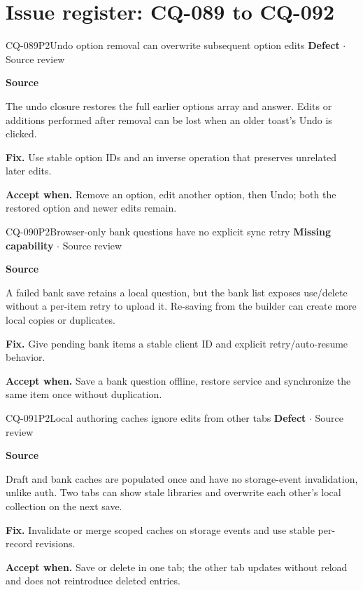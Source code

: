 \section*{Issue register: CQ-089 to CQ-092}
\begin{finding}{CQ-089}{P2}{Undo option removal can overwrite subsequent option edits}
\textbf{Defect} $\cdot$ Source review\par
\textbf{Source}\quad{}\par
The undo closure restores the full earlier options array and answer. Edits or additions performed after removal can be lost when an older toast's Undo is clicked.\par
\textbf{Fix.} Use stable option IDs and an inverse operation that preserves unrelated later edits.\par
\textbf{Accept when.} Remove an option, edit another option, then Undo; both the restored option and newer edits remain.
\end{finding}
\begin{finding}{CQ-090}{P2}{Browser-only bank questions have no explicit sync retry}
\textbf{Missing capability} $\cdot$ Source review\par
\textbf{Source}\quad{}\par
A failed bank save retains a local question, but the bank list exposes use/delete without a per-item retry to upload it. Re-saving from the builder can create more local copies or duplicates.\par
\textbf{Fix.} Give pending bank items a stable client ID and explicit retry/auto-resume behavior.\par
\textbf{Accept when.} Save a bank question offline, restore service and synchronize the same item once without duplication.
\end{finding}
\begin{finding}{CQ-091}{P2}{Local authoring caches ignore edits from other tabs}
\textbf{Defect} $\cdot$ Source review\par
\textbf{Source}\quad{}\par
Draft and bank caches are populated once and have no storage-event invalidation, unlike auth. Two tabs can show stale libraries and overwrite each other's local collection on the next save.\par
\textbf{Fix.} Invalidate or merge scoped caches on storage events and use stable per-record revisions.\par
\textbf{Accept when.} Save or delete in one tab; the other tab updates without reload and does not reintroduce deleted entries.
\end{finding}
